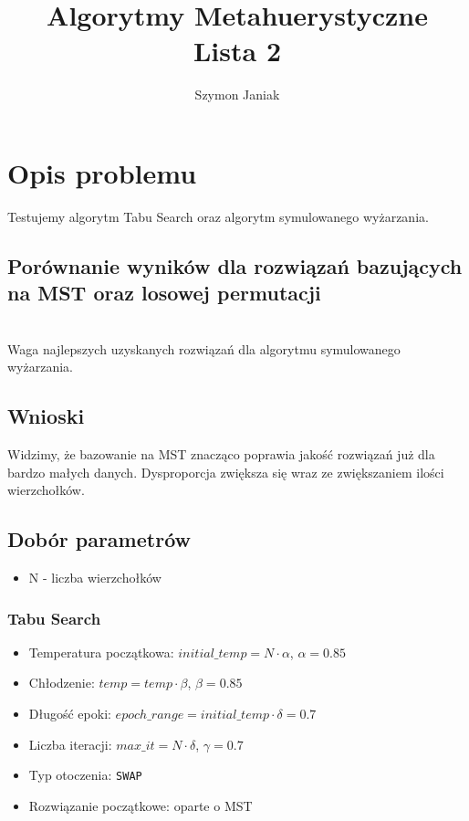 \documentclass{article}
\title{%
	Algorytmy Metahuerystyczne \\
	\large Lista 2}
\author{Szymon Janiak}
\begin{document}
\maketitle

\section*{Opis problemu}
	Testujemy algorytm Tabu Search oraz algorytm symulowanego wyżarzania.

\subsection*{Porównanie wyników dla rozwiązań bazujących na MST oraz losowej permutacji}
    \begin{center}
		\\Waga najlepszych uzyskanych rozwiązań dla algorytmu symulowanego wyżarzania.
    \end{center}
\subsection*{Wnioski}
	Widzimy, że bazowanie na MST znacząco poprawia jakość rozwiązań już dla bardzo małych danych. Dysproporcja zwiększa się wraz ze zwiększaniem ilości wierzchołków.

\subsection*{Dobór parametrów}
	\begin{itemize}
		\item N - liczba wierzchołków
	\end{itemize}
\subsubsection*{Tabu Search}
	\begin{itemize}
		\item Temperatura początkowa: $initial\_temp = N \cdot \alpha$, $\alpha = 0.85$
		\item Chłodzenie: $temp = temp \cdot \beta $, $\beta = 0.85$
		\item Długość epoki: $epoch\_range = initial\_temp \cdot \delta = 0.7$
		\item Liczba iteracji: $max\_it = N \cdot \delta$, $\gamma = 0.7$
		\item Typ otoczenia: \texttt{SWAP}
		\item Rozwiązanie początkowe: oparte o MST
	\end{itemize}
\end{document}
